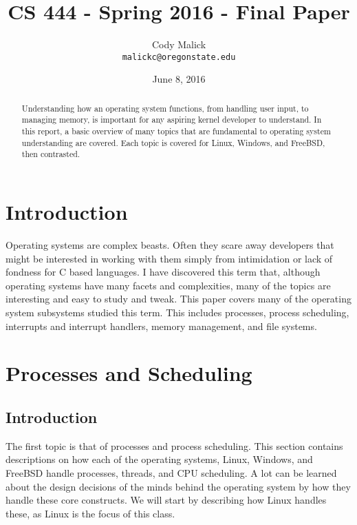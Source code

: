 \documentclass[10pt,letterpaper,onecolumn,draftclsnofoot]{IEEEtran}
\begin{document}
\begin{titlepage}
  \title{CS 444 - Spring 2016 - Final Paper}
  \author{Cody Malick\\
  \texttt{malickc@oregonstate.edu}}
  \date{June 8, 2016}
  \maketitle
  \vspace*{4cm}
  \begin{abstract}
      \noindent Understanding how an operating system functions, from handling user
      input, to managing memory, is important for any aspiring kernel developer to
      understand. In this report, a basic overview of many topics that are fundamental
      to operating system understanding are covered. Each topic is covered for Linux,
      Windows, and FreeBSD, then contrasted. 
      
      
  \end{abstract}
\end{titlepage}

\tableofcontents
\clearpage
\section{Introduction}
Operating systems are complex beasts. Often they scare away developers that might
be interested in working with them simply from intimidation or lack of fondness for
C based languages. I have discovered this term that, although operating systems have many facets and complexities, many of the topics are interesting and easy to study and tweak. This paper covers many of the operating system subsystems studied this term. This includes processes, process scheduling, interrupts and interrupt handlers, memory management, and file systems.

\section{Processes and Scheduling}

\subsection{Introduction}
The first topic is that of processes and process scheduling. This section
contains descriptions on how each of the operating systems, Linux, Windows,
and FreeBSD handle processes, threads, and CPU scheduling. A lot can be
learned about the design decisions of the minds behind the operating system by
how they handle these core constructs. We will start by describing how Linux
handles these, as Linux is the focus of this class.
\end{document}
